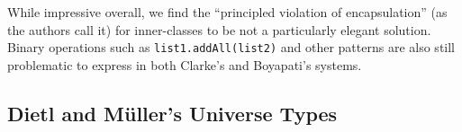 \documentclass{acm_proc_article-sp}
\begin{document}
While impressive overall, we find the ``principled violation of encapsulation''
(as the authors call it) for inner-classes to be not a particularly elegant
solution. Binary operations such as \linebreak\lstinline|list1.addAll(list2)|
and other patterns are also still problematic to express in both Clarke's and
Boyapati's systems.


%


\subsection{Dietl and M\"{u}ller's Universe Types}
\label{subsec:dietl}

%
%
%
%
\end{document}
